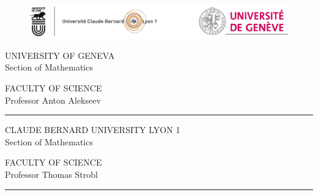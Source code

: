 \documentclass[a4paper,twoside,11pt]{scrbook}
\theoremstyle{plain}
\theoremstyle{remark}
\theoremstyle{definition}
\begin{document}

\begin{titlepage}

\begin{figure}
	\centering
	\includegraphics[width=1\textwidth]{bilder/Lyon.png}
	
\end{figure}


\begin{minipage}[t]{0.5\textwidth}
UNIVERSITY OF GENEVA\\
\vfill 
Section of Mathematics
\end{minipage}
\begin{minipage}[t]{0.5\textwidth}
\hfill FACULTY OF SCIENCE\\
\vfill
\hfill Professor Anton Alekseev
\end{minipage}

\vspace{.3cm}
\hrule
\vspace{.3cm}

\begin{minipage}[t]{0.5\textwidth}
CLAUDE BERNARD UNIVERSITY LYON 1\\
\vfill 
Section of Mathematics
\end{minipage}
\begin{minipage}[t]{0.5\textwidth}
\hfill FACULTY OF SCIENCE\\
\vfill
\hfill Professor Thomas Strobl
\end{minipage}
\vspace{.3cm}
\hrule


\end{titlepage}
\end{document}

